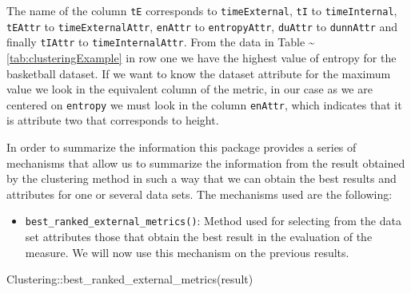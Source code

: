 \documentclass[
]{article}
\newenvironment{Shaded}{\begin{snugshade}}{\end{snugshade}}
\newcommand{\FunctionTok}[1]{\textcolor[rgb]{0.00,0.00,0.00}{#1}}
\newcommand{\NormalTok}[1]{#1}
\newcommand{\SpecialCharTok}[1]{\textcolor[rgb]{0.00,0.00,0.00}{#1}}
\providecommand{\tightlist}{%
  \setlength{\itemsep}{0pt}\setlength{\parskip}{0pt}}
\begin{document}
The name of the column \texttt{tE} corresponds to \texttt{timeExternal},
\texttt{tI} to \texttt{timeInternal}, \texttt{tEAttr} to
\texttt{timeExternalAttr}, \texttt{enAttr} to \texttt{entropyAttr},
\texttt{duAttr} to \texttt{dunnAttr} and finally \texttt{tIAttr} to
\texttt{timeInternalAttr}. From the data in Table
\textasciitilde{}\ref{tab:clusteringExample} in row one we have the
highest value of entropy for the basketball dataset. If we want to know
the dataset attribute for the maximum value we look in the equivalent
column of the metric, in our case as we are centered on \texttt{entropy}
we must look in the column \texttt{enAttr}, which indicates that it is
attribute two that corresponds to height.

In order to summarize the information this package provides a series of
mechanisms that allow us to summarize the information from the result
obtained by the clustering method in such a way that we can obtain the
best results and attributes for one or several data sets. The mechanisms
used are the following:

\begin{itemize}
\tightlist
\item
  \texttt{best\_ranked\_external\_metrics()}: Method used for selecting
  from the data set attributes those that obtain the best result in the
  evaluation of the measure. We will now use this mechanism on the
  previous results.
\end{itemize}

\begin{Shaded}
\begin{Highlighting}[]
\NormalTok{Clustering}\SpecialCharTok{::}\FunctionTok{best\_ranked\_external\_metrics}\NormalTok{(result)}
\end{Highlighting}
\end{Shaded}
\end{document}
